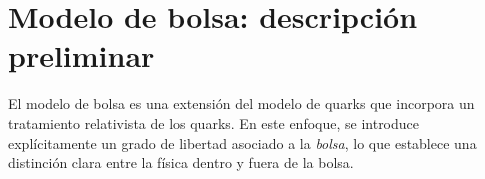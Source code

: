 %
%
%
%


\section{Modelo de bolsa: descripción preliminar}

El modelo de bolsa es una extensión del modelo de quarks que incorpora un tratamiento relativista de los quarks. En este enfoque, se introduce explícitamente un grado de libertad asociado a la \emph{bolsa}, lo que establece una distinción clara entre la física dentro y fuera de la bolsa.

